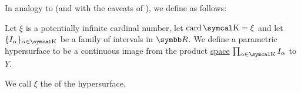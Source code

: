 \begin{Definition}\label{def:parametric_hypersurface}
  In analogy to  (and with the caveats of ), we define  as follows:

  Let \( \xi \) is a potentially infinite cardinal number, let \( \Card \CK = \xi \) and let \( \{ I_\alpha \}_{\alpha \in \CK} \) be a family of intervals in \( \BR \). We define a parametric hypersurface to be a continuous image from the product \hyperref[def:topological_product]{space} \( \prod_{\alpha \in \CK} I_\alpha \) to \( Y \).

  We call \( \xi \) the  of the hypersurface.
\end{Definition}
